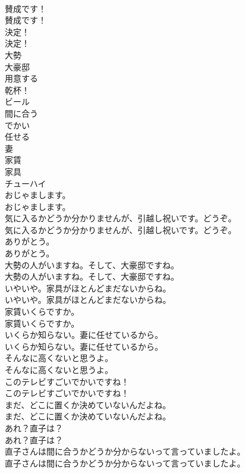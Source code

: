 \documentclass[8pt]{extreport}
\begin{document}
\begin{CJK}{UTF8}{min}
\\	賛成です！	
\\	賛成です！ 
\\	決定！	
\\	決定！ 
\\	大勢
\\	大豪邸
\\	用意する
\\	乾杯！
\\	ビール
\\	間に合う
\\	でかい
\\	任せる
\\	妻
\\	家賃
\\	家具
\\	チューハイ
\\	おじゃまします。	
\\	おじゃまします。 
\\	気に入るかどうか分かりませんが、引越し祝いです。どうぞ。	
\\	気に入るかどうか分かりませんが、引越し祝いです。どうぞ。 
\\	ありがとう。	
\\	ありがとう。 
\\	大勢の人がいますね。そして、大豪邸ですね。	
\\	大勢の人がいますね。そして、大豪邸ですね。 
\\	いやいや。家具がほとんどまだないからね。	
\\	いやいや。家具がほとんどまだないからね。 
\\	家賃いくらですか。	
\\	家賃いくらですか。 
\\	いくらか知らない。妻に任せているから。	
\\	いくらか知らない。妻に任せているから。 
\\	そんなに高くないと思うよ。	
\\	そんなに高くないと思うよ。 
\\	このテレビすごいでかいですね！	
\\	このテレビすごいでかいですね！ 
\\	まだ、どこに置くか決めていないんだよね。	
\\	まだ、どこに置くか決めていないんだよね。 
\\	あれ？直子は？	
\\	あれ？直子は？ 
\\	直子さんは間に合うかどうか分からないって言っていましたよ。	
\\	直子さんは間に合うかどうか分からないって言っていましたよ。 

\end{CJK}
\end{document}
